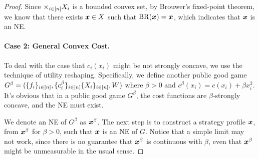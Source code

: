 \begin{proof}



Since $\times_{i\in[n]} X_i$ is a bounded convex set, by Brouwer's fixed-point theorem, we know that there exists ${\bm{x}} \in X$ such that $\mathrm{BR}({\bm{x}}) = {\bm{x}}$, which indicates that ${\bm{x}}$ is an NE.

\paragraph{Case 2: General Convex Cost.}

To deal with the case that $c_i(x_i)$ might be not strongly concave, we use the technique of utility reshaping. Specifically, we define another public good game $G^\beta = (\{f_i\}_{i\in[n]}, \{c^\beta_i\}_{i\in[n]} \{X_i\}_{i\in[n]}, W)$ where $\beta > 0$ and $c^\beta(x_i) = c(x_i) + \beta x_i^2$. It's obvious that in a public good game $G^\beta$, the cost functions are $\beta$-strongly concave, and the NE must exist.

We denote an NE of $G^\beta$ as ${\bm{x}}^\beta$. The next step is to construct a strategy profile ${\bm{x}}$, from ${\bm{x}}^\beta$ for $\beta >0$, such that ${\bm{x}}$ is an NE of $G$. Notice that a simple limit may not work, since there is no guarantee that ${\bm{x}}^\beta$ is continuous with $\beta$, even that ${\bm{x}}^\beta$ might be unmeasurable in the usual sense.


\end{proof}
